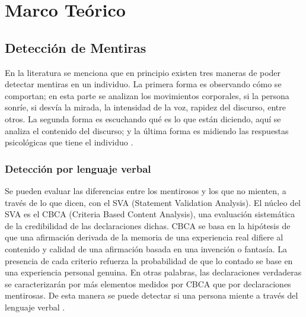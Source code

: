 \chapter{Marco Teórico} %
\label{Chapter2} %
\begin{onehalfspacing}
%
%
%
%
\section{Detección de Mentiras}
\label{sec:Deteccion_de_Mentiras}
En la literatura se menciona que en principio existen tres maneras de poder detectar mentiras en un individuo. La primera forma es observando cómo se comportan; en esta parte se analizan los movimientos corporales, si la persona sonríe, si desvía la mirada, la intensidad de la voz, rapidez del discurso, entre otros. La segunda forma es escuchando qué es lo que están diciendo, aquí se analiza el contenido del discurso; y la última forma es midiendo las respuestas psicológicas que tiene el individuo \cite{Grubin2005LieReview}.\\

\subsection{Detección por lenguaje verbal}
\label{sec:Lenguaje_verbal}

Se pueden evaluar las diferencias entre los mentirosos y los que no mienten, a través de lo que dicen, con el SVA (Statement Validation Analysis). El núcleo del SVA es el CBCA (Criteria Based Content Analysis), una evaluación sistemática de la credibilidad de las declaraciones dichas. CBCA se basa en la hipótesis de que una afirmación derivada de la memoria de una experiencia real difiere al contenido y calidad de una afirmación basada en una invención o fantasía. La presencia de cada criterio refuerza la probabilidad de que lo contado se base en una experiencia personal genuina. En otras palabras, las declaraciones verdaderas se caracterizarán por más elementos medidos por CBCA que por declaraciones mentirosas. De esta manera se puede detectar si una persona miente a través del lenguaje verbal \cite{Vrij2000DetectingBehavior}.\\


\end{onehalfspacing}
